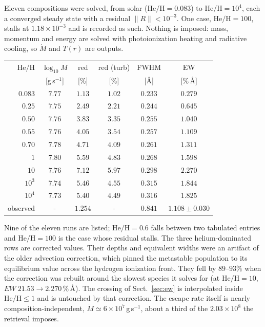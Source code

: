 \documentclass[english,a4paper]{my_memo}
\begin{document}
Eleven compositions were solved, from solar ($\mathrm{He/H} = 0.083$) to
$\mathrm{He/H} = 10^{4}$, each a converged steady state with a residual
$\|R\| < 10^{-3}$. One case, $\mathrm{He/H} = 100$, stalls at
$1.18\times10^{-3}$ and is recorded as such. Nothing is imposed: mass,
momentum and energy are solved with photoionization heating and radiative
cooling, so $\dot M$ and $T(r)$ are outputs.

\begin{center}
\begin{tabular}{rccccc}
\toprule
$\mathrm{He/H}$ & $\log_{10}\dot M$ & red & red (turb) & FWHM & EW \\
 & [g\,s$^{-1}$] & [\%] & [\%] & [\AA] & [\%\,\AA] \\
\midrule
$0.083$ & $7.77$ & $1.13$  & $1.02$  & $0.233$ & $0.279$ \\
$0.25$  & $7.75$ & $2.49$  & $2.21$  & $0.244$ & $0.645$ \\
$0.50$  & $7.76$ & $3.83$  & $3.35$  & $0.255$ & $1.040$ \\
$0.55$  & $7.76$ & $4.05$  & $3.54$  & $0.257$ & $1.109$ \\
$0.70$  & $7.78$ & $4.71$  & $4.09$  & $0.261$ & $1.311$ \\
$1$     & $7.80$ & $5.59$  & $4.83$  & $0.268$ & $1.598$ \\
$10$    & $7.76$ & $7.12$  & $5.97$  & $0.298$ & $2.270$ \\
$10^{3}$& $7.74$ & $5.46$  & $4.55$  & $0.315$ & $1.844$ \\
$10^{4}$& $7.73$ & $5.40$  & $4.49$  & $0.316$ & $1.825$ \\
\midrule
observed & - & $1.254$ & - & $0.841$ & $1.108 \pm 0.030$ \\
\bottomrule
\end{tabular}
\end{center}

Nine of the eleven runs are listed; $\mathrm{He/H} = 0.6$ falls between two
tabulated entries and $\mathrm{He/H} = 100$ is the case whose residual
stalls. The three helium-dominated rows are corrected values. Their depths
and equivalent widths were an artifact of the older advection correction,
which pinned the metastable population to its equilibrium value across the
hydrogen ionization front. They fell by $89$--$93\%$ when the correction was
rebuilt around the slowest species it solves for (at $\mathrm{He/H} = 10$,
$EW\ 21.53 \rightarrow 2.270$\,\%\,\AA). The crossing of Sect.~\ref{sec:ew}
is interpolated inside $\mathrm{He/H} \le 1$ and is untouched by that
correction. The escape rate itself is nearly composition-independent,
$\dot M \simeq 6\times10^{7}$\,g\,s$^{-1}$, about a third of the
$2.03\times10^{8}$ the retrieval imposes.
\end{document}
